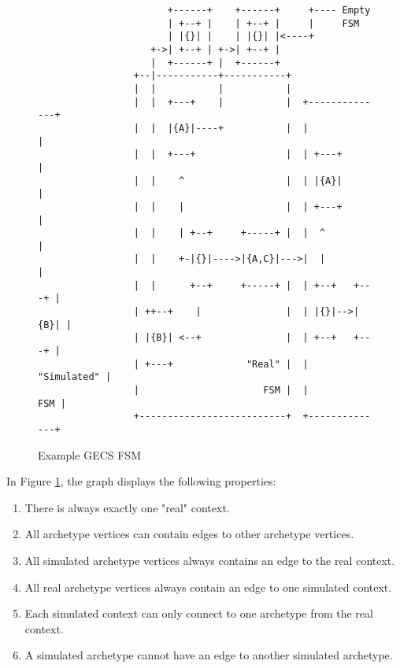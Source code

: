 \begin{figure}[H]
    \centering
    \begin{verbatim}                                                                            
                       +------+    +------+     +---- Empty                                 
                       | +--+ |    | +--+ |     |     FSM                           
                       | |{}| |    | |{}| |<----+                                     
                    +->| +--+ | +->| +--+ |                                      
                    |  +------+ |  +------+                                      
                 +--|-----------+-----------+                                    
                 |  |           |           |                                    
                 |  |  +---+    |           |  +--------------+                  
                 |  |  |{A}|----+           |  |              |                  
                 |  |  +---+                |  | +---+        |                  
                 |  |    ^                  |  | |{A}|        |                  
                 |  |    |                  |  | +---+        |                  
                 |  |    | +--+     +-----+ |  |  ^           |                  
                 |  |    +-|{}|---->|{A,C}|--->|  |           |                  
                 |  |      +--+     +-----+ |  | +--+   +---+ |                  
                 | ++--+    |               |  | |{}|-->|{B}| |                  
                 | |{B}| <--+               |  | +--+   +---+ |                  
                 | +---+             "Real" |  |  "Simulated" |                  
                 |                      FSM |  |          FSM |                  
                 +--------------------------+  +--------------+                
   \end{verbatim}
    \caption{Example GECS FSM}
    \label{fig:gecs_fsm}
\end{figure}

In Figure \ref{fig:gecs_fsm}, the graph displays the following properties:
\begin{enumerate}
    \item There is always exactly one "real" context.
    \item All archetype vertices can contain edges to other archetype vertices.
    \item All simulated archetype vertices always contains an edge to the real context.
    \item All real archetype vertices always contain an edge to one simulated context.
    \item Each simulated context can only connect to one archetype from the real context.
    \item A simulated archetype cannot have an edge to another simulated archetype.
\end{enumerate}

